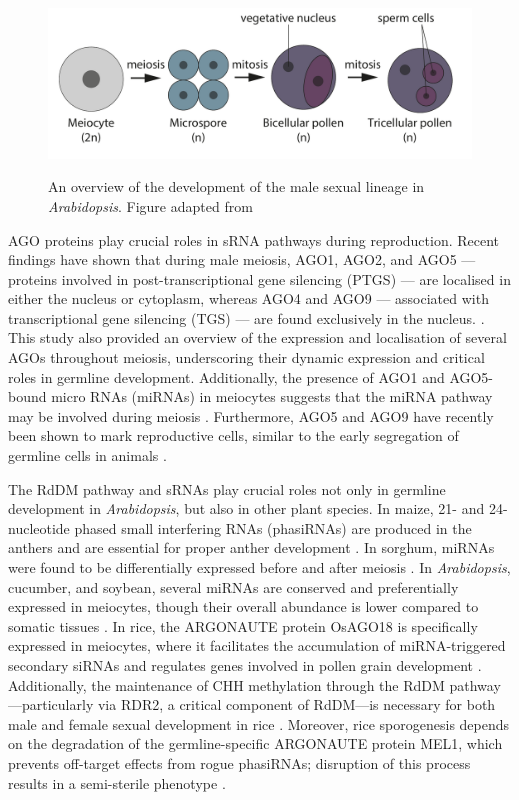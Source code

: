 \begin{figure}[htbp!] 
\centering    
    \includegraphics[width=1\textwidth]{Chapter1/Figs/male_sex_dev.pdf}
\caption{An overview of the development of the male sexual lineage in \textit{Arabidopsis}. Figure adapted from \cite{RN199}}
\label{fig:male_sex_dev}
\captionsetup{font=small}
    \caption*{\cite{RN199}}
\end{figure}

AGO proteins play crucial roles in sRNA pathways during reproduction. Recent findings have shown that during male meiosis, AGO1, AGO2, and AGO5 — proteins involved in post-transcriptional gene silencing (PTGS) — are localised in either the nucleus or cytoplasm, whereas AGO4 and AGO9 — associated with transcriptional gene silencing (TGS) — are found exclusively in the nucleus. \cite{RN149}. This study also provided an overview of the expression and localisation of several AGOs throughout meiosis, underscoring their dynamic expression and critical roles in germline development. Additionally, the presence of AGO1 and AGO5-bound micro RNAs (miRNAs) in meiocytes suggests that the miRNA pathway may be involved during meiosis \cite{RN149}. Furthermore, AGO5 and AGO9 have recently been shown to mark reproductive cells, similar to the early segregation of germline cells in animals \cite{RN291}. 

The RdDM pathway and sRNAs play crucial roles not only in germline development in \textit{Arabidopsis}, but also in other plant species. In maize, 21- and 24-nucleotide phased small interfering RNAs (phasiRNAs) are produced in the anthers and are essential for proper anther development \cite{RN292,RN293}. In sorghum, miRNAs were found to be differentially expressed before and after meiosis \cite{RN150}. In \textit{Arabidopsis}, cucumber, and soybean, several miRNAs are conserved and preferentially expressed in meiocytes, though their overall abundance is lower compared to somatic tissues \cite{RN151}. In rice, the ARGONAUTE protein OsAGO18 is specifically expressed in meiocytes, where it facilitates the accumulation of miRNA-triggered secondary siRNAs and regulates genes involved in pollen grain development \cite{RN153}. Additionally, the maintenance of CHH methylation through the RdDM pathway—particularly via RDR2, a critical component of RdDM—is necessary for both male and female sexual development in rice \cite{RN154}. Moreover, rice sporogenesis depends on the degradation of the germline-specific ARGONAUTE protein MEL1, which prevents off-target effects from rogue phasiRNAs; disruption of this process results in a semi-sterile phenotype \cite{RN155}.

